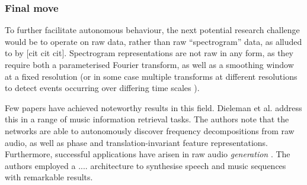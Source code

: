 \documentclass[12pt]{llncs}
\begin{document}
	




\subsubsection{Final move}

To further facilitate autonomous behaviour, the next potential research challenge would be to operate on raw data, rather than raw ``spectrogram'' data, as alluded to by [cit cit cit]. Spectrogram representations are not raw in any form, as they require both a parameterised Fourier transform, as well as a smoothing window at a fixed resolution (or in some case multiple transforms at different resolutions to detect events occurring over differing time scales \cite{espi2015exploiting}).

Few papers have achieved noteworthy results in this field. Dieleman et al. \cite{dieleman2014end} address this in a range of music information retrieval tasks. The authors note that the networks are able to autonomously discover frequency decompositions from raw audio, as well as phase and translation-invariant feature representations. Furthermore, successful applications have arisen in raw audio \emph{generation} \cite{van2016wavenet}. The authors employed a .... architecture to synthesise speech and music sequences with remarkable results.
\end{document}
